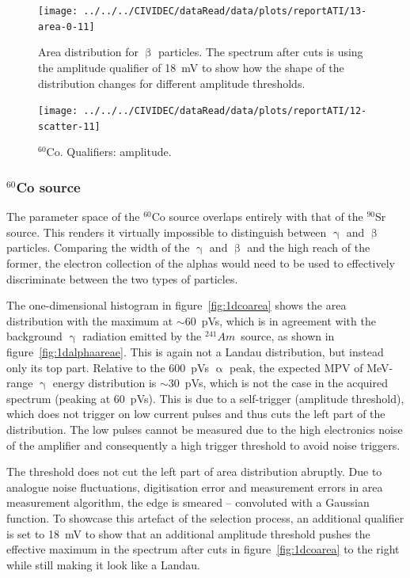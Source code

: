 \begin{figure}[]
\centering
\texttt{[image: ../../../CIVIDEC/dataRead/data/plots/reportATI/13-area-0-11]}
\caption{Area distribution for $\upbeta$ particles. The spectrum after cuts is using the amplitude qualifier of 18~mV to show how the shape of the distribution changes for different amplitude thresholds.
}
\label{fig:1dsrarea}
\end{figure} 
 
 
\clearpage
\begin{figure}[]
\centering
\texttt{[image: ../../../CIVIDEC/dataRead/data/plots/reportATI/12-scatter-11]}
\caption{$^{60}$Co. Qualifiers: amplitude.}
\label{fig:scatterco}
\end{figure}

\clearpage
\subsubsection{$^{60}$Co source}
\label{sec:gammasrc}
The parameter space of the $^{60}$Co source overlaps entirely with that of the $^{90}$Sr source. This renders it virtually impossible to distinguish between $\upgamma$ and $\upbeta$ particles. Comparing the width of the $\upgamma$ and $\upbeta$ and the high reach of the former, the electron collection of the alphas would need to be used to effectively discriminate between the two types of particles. 

The one-dimensional histogram in figure~\ref{fig:1dcoarea} shows the area distribution with the maximum at $\sim$60~pVs, which is in agreement with the background $\upgamma$ radiation emitted by the $^{241}Am$~source, as shown in figure~\ref{fig:1dalphaareae}. This is again not a Landau distribution, but instead only its top part. Relative to the 600~pVs $\upalpha$ peak, the expected MPV of MeV-range $\upgamma$ energy distribution is $\sim$30~pVs, which is not the case in the acquired spectrum (peaking at 60~pVs). This is due to a self-trigger (amplitude threshold), which does not trigger on low current pulses and thus cuts the left part of the distribution. The low pulses cannot be measured due to the high electronics noise of the amplifier and consequently a high trigger threshold to avoid noise triggers. 

The threshold does not cut the left part of area distribution abruptly. Due to analogue noise fluctuations, digitisation error and measurement errors in area measurement algorithm, the edge is smeared -- convoluted with a Gaussian function. To showcase this artefact of the selection process, an additional qualifier is set to 18~mV to show that an additional amplitude threshold pushes the effective maximum in the spectrum after cuts in figure~\ref{fig:1dcoarea} to the right while still making it look like a Landau.

